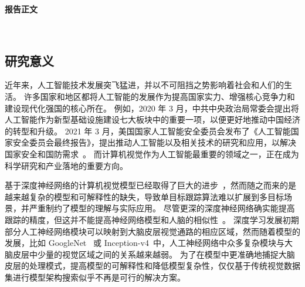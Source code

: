 \documentclass[a4paper,zihao=-4]{article}
\begin{document}
\kaishu

\setlength{\abovedisplayskip}{0pt}
\setlength{\belowdisplayskip}{0pt}

\begin{center}
	{\kaishu {} \textbf{报告正文} \vspace{-3ex}}
\end{center}  

\thispagestyle{empty} 　　　%




\textcolor{NsfcBlue}{\subsection{研究意义}}
近年来，人工智能技术发展突飞猛进，并以不可阻挡之势影响着社会和人们的生活。
许多国家和地区都将人工智能的发展作为提高国家实力、增强核心竞争力和建设现代化强国的核心所在。
例如，2020 年 3 月，中共中央政治局常委会提出将人工智能作为新型基础设施建设七大板块中的重要一项，以便更好地推动中国经济的转型和升级。
2021 年 3 月，美国国家人工智能安全委员会发布了《人工智能国家安全委员会最终报告》，提出推动人工智能以及相关技术的研究和应用，以解决国家安全和国防需求~\cite{schmidt2021national}。
而计算机视觉作为人工智能最重要的领域之一，正在成为科学研究和产业落地的重要方向。

基于深度神经网络的计算机视觉模型已经取得了巨大的进步~\cite{ILSVRC15}，然而随之而来的是越来越复杂的模型和可解释性的缺失，导致单目标跟踪算法难以扩展到多目标场景，并严重制约了模型的理解与实际应用。
尽管更深的深度神经网络确实能提高跟踪的精度，但这并不能提高神经网络模型和人脑的相似性~\cite{rajalingham2018large}。
深度学习发展初期部分人工神经网络模块可以映射到大脑皮层视觉通路的相应区域，然而随着模型的发展，比如 GoogleNet~\cite{szegedy2015going} 或 Inception-v4~\cite{szegedy2017inception}中，人工神经网络中众多复杂模块与大脑皮层中少量的视觉区域之间的关系越来越弱。
为了在模型中更准确地捕捉大脑皮层的处理模式，提高模型的可解释性和降低模型复杂性，仅仅基于传统视觉数据集进行模型架构搜索似乎不再是可行的解决方案。
\end{document}
